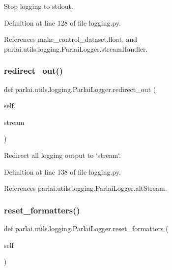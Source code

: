 \begin{DoxyVerb}Stop logging to stdout.\end{DoxyVerb}
 

Definition at line 128 of file logging.\+py.



References make\+\_\+control\+\_\+dataset.\+float, and parlai.\+utils.\+logging.\+Parlai\+Logger.\+stream\+Handler.

\mbox{\label{classparlai_1_1utils_1_1logging_1_1ParlaiLogger_a22d5f670d10de4270b40bf3c683a9fd1}} 
\subsubsection{\texorpdfstring{redirect\+\_\+out()}{redirect\_out()}}
{\footnotesize\ttfamily def parlai.\+utils.\+logging.\+Parlai\+Logger.\+redirect\+\_\+out (\begin{DoxyParamCaption}\item[{}]{self,  }\item[{}]{stream }\end{DoxyParamCaption})}

\begin{DoxyVerb}Redirect all logging output to `stream`.\end{DoxyVerb}
 

Definition at line 138 of file logging.\+py.



References parlai.\+utils.\+logging.\+Parlai\+Logger.\+alt\+Stream.

\mbox{\label{classparlai_1_1utils_1_1logging_1_1ParlaiLogger_a48e352dd5d21a2bb0637653b9bc7b354}} 
\subsubsection{\texorpdfstring{reset\+\_\+formatters()}{reset\_formatters()}}
{\footnotesize\ttfamily def parlai.\+utils.\+logging.\+Parlai\+Logger.\+reset\+\_\+formatters (\begin{DoxyParamCaption}\item[{}]{self }\end{DoxyParamCaption})}


